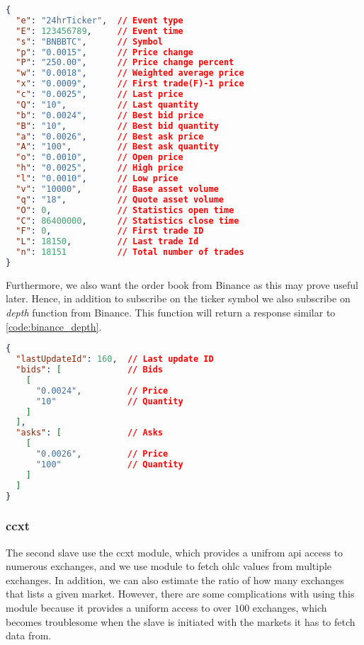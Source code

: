\begin{lstlisting}[language=json, caption={Ticker response from Binance (Source \cite{binance_git})}, label=code:binance_tick, firstnumber=1]
{
  "e": "24hrTicker",  // Event type
  "E": 123456789,     // Event time
  "s": "BNBBTC",      // Symbol
  "p": "0.0015",      // Price change
  "P": "250.00",      // Price change percent
  "w": "0.0018",      // Weighted average price
  "x": "0.0009",      // First trade(F)-1 price
  "c": "0.0025",      // Last price
  "Q": "10",          // Last quantity
  "b": "0.0024",      // Best bid price
  "B": "10",          // Best bid quantity
  "a": "0.0026",      // Best ask price
  "A": "100",         // Best ask quantity
  "o": "0.0010",      // Open price
  "h": "0.0025",      // High price
  "l": "0.0010",      // Low price
  "v": "10000",       // Base asset volume
  "q": "18",          // Quote asset volume
  "O": 0,             // Statistics open time
  "C": 86400000,      // Statistics close time
  "F": 0,             // First trade ID
  "L": 18150,         // Last trade Id
  "n": 18151          // Total number of trades
}
\end{lstlisting}

Furthermore, we also want the order book from Binance as this may prove useful later. Hence, in addition to subscribe on the ticker symbol we also subscribe on \emph{depth} function from Binance. This function will return a response similar to \autoref{code:binance_depth}.
\begin{lstlisting}[language=json, caption={Depth response from Binance (Source \cite{binance_git})}, label=code:binance_depth, firstnumber=1]
{
  "lastUpdateId": 160,  // Last update ID
  "bids": [             // Bids
    [
      "0.0024",         // Price
      "10"              // Quantity
    ]
  ],
  "asks": [             // Asks
    [
      "0.0026",         // Price
      "100"             // Quantity
    ]
  ]
}
\end{lstlisting}

\subsubsection{ccxt}
The second slave use the ccxt module, which provides a unifrom \ac{api} access to numerous exchanges, and we use module to fetch \ac{ohlc} values from multiple exchanges. In addition, we can also estimate the ratio of how many exchanges that lists a given market. However, there are some complications with using this module because it provides a uniform access to over $100$ exchanges, which becomes troublesome when the slave is initiated with the markets it has to fetch data from.

